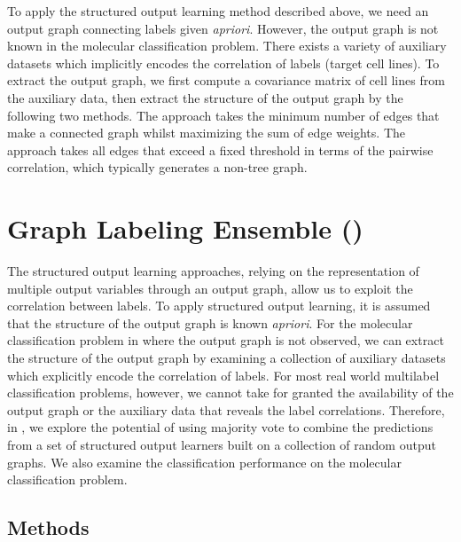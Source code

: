 {%
To apply the structured output learning method described above, we need an output graph connecting labels given \textit{apriori}.
However, the output graph is not known in the molecular classification problem.
There exists a variety of auxiliary datasets \citep{Shoemaker06the} which implicitly encodes the correlation of labels (target cell lines).
To extract the output graph, we first compute a covariance matrix of cell lines from the auxiliary data, then extract the structure of the output graph by the following two methods.
The  approach takes the minimum number of edges that make a connected graph whilst maximizing the sum of edge weights.
The  approach takes all edges that exceed a fixed threshold in terms of the pairwise correlation, which typically generates a non-tree graph.



%
%
\section{Graph Labeling Ensemble (\mve)}\label{sc_su11}

The structured output learning approaches, relying on the representation of multiple output variables through an output graph, allow us to exploit the correlation between labels.
To apply structured output learning, it is assumed that the structure of the output graph is known \textit{apriori}.
For the molecular classification problem in  where the output graph is not observed, we can extract the structure of the output graph by examining a collection of auxiliary datasets which explicitly encode the correlation of labels.
For most real world multilabel classification problems, however, we cannot take for granted the availability of the output graph or the auxiliary data that reveals the label correlations.
Therefore, in , we explore the potential of using majority vote to combine the predictions from a set of structured output learners built on a collection of random output graphs.
We also examine the classification performance on the molecular classification problem.


%
%
\subsection{Methods}

}
